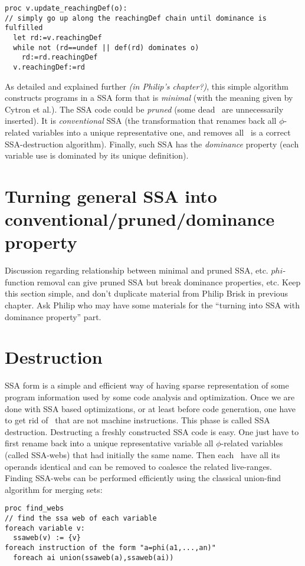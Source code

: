 \begin{verbatim}
proc v.update_reachingDef(o):
// simply go up along the reachingDef chain until dominance is fulfilled 
  let rd:=v.reachingDef
  while not (rd==undef || def(rd) dominates o)
    rd:=rd.reachingDef
  v.reachingDef:=rd
\end{verbatim}

As detailed and explained further \emph{(in Philip's chapter?)}, this simple algorithm constructs programs in a SSA form that is \textit{minimal} (with the meaning given by Cytron et al.).
The SSA code could be \textit{pruned} (some dead \phiops\ are unnecessarily inserted).
It is \textit{conventional} SSA (the transformation that renames back all $\phi$-related variables into a unique representative one, and removes all \phiops\ is a correct SSA-destruction algorithm).
Finally, such SSA has the \textit{dominance} property (each variable use is dominated by its unique definition).

\section{Turning general SSA into conventional/pruned/dominance property}

Discussion regarding relationship between minimal and pruned SSA, etc.
$phi$-function removal can give pruned SSA but break
dominance properties, etc. Keep this section simple, and don't duplicate
material from Philip Brisk in previous chapter.
Ask Philip who may have some materials for the ``turning into SSA with dominance property'' part.


\section{Destruction }
\label{sec:classical_destruction}

SSA form is a simple and efficient way of having sparse representation of some program information used by some code analysis and optimization. Once we are done with SSA based optimizations, or at least before code generation, one have to get rid of \phiops\ that are not machine instructions. This phase is called SSA destruction. 
Destructing a freshly constructed SSA code is easy. One just have to first rename back into a unique representative variable all $\phi$-related variables (called SSA-webs) that had initially the same name. Then each \phiop\ have all its operands identical and can be removed to coalesce the related live-ranges.
Finding SSA-webs can be performed efficiently using the classical union-find algorithm for merging sets:
\begin{verbatim}
proc find_webs
// find the ssa web of each variable
foreach variable v:
  ssaweb(v) := {v}
foreach instruction of the form "a=phi(a1,...,an)"
  foreach ai union(ssaweb(a),ssaweb(ai))
\end{verbatim}

